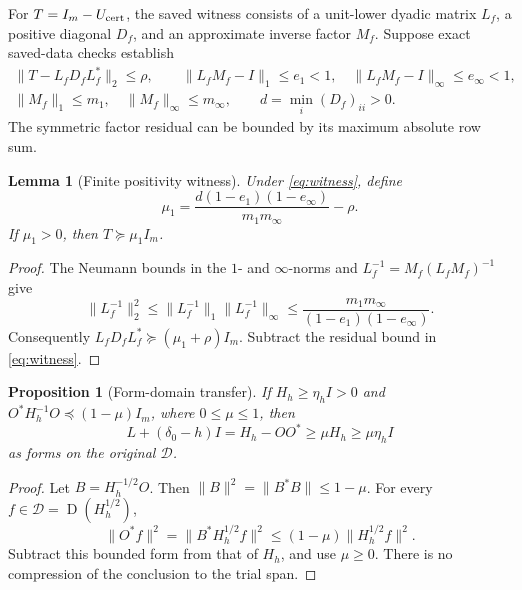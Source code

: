\documentclass[11pt,a4paper]{article}
\newcommand{\DD}{\mathcal D}
\newcommand{\Id}{I}
\newcommand{\Dom}{\operatorname{D}}
\newcommand{\norm}[1]{\lVert #1\rVert}
\newtheorem{proposition}[theorem]{Proposition}
\newtheorem{lemma}[theorem]{Lemma}
\theoremstyle{definition}
\theoremstyle{remark}
\numberwithin{equation}{section}
\begin{document}
For \(T=I_m-U_{\rm cert}\), the saved witness consists of a unit-lower
dyadic matrix \(L_f\), a positive diagonal \(D_f\), and an approximate
inverse factor \(M_f\). Suppose exact saved-data checks establish
\begin{equation}\label{eq:witness}
 \begin{gathered}
 \norm{T-L_fD_fL_f^*}_2\le\rho,\qquad
 \norm{L_fM_f-I}_1\le e_1<1,\quad
 \norm{L_fM_f-I}_\infty\le e_\infty<1,\\
 \norm{M_f}_1\le m_1,\quad \norm{M_f}_\infty\le m_\infty,\qquad
 d=\min_i(D_f)_{ii}>0.
 \end{gathered}
\end{equation}
The symmetric factor residual can be bounded by its maximum absolute
row sum.

\begin{lemma}[Finite positivity witness]\label{lem:factor}
Under \eqref{eq:witness}, define
\begin{equation}\label{eq:mu}
 \mu_1=\frac{d(1-e_1)(1-e_\infty)}{m_1m_\infty}-\rho.
\end{equation}
If \(\mu_1>0\), then \(T\succeq\mu_1 I_m\).
\end{lemma}
\begin{proof}
The Neumann bounds in the \(1\)- and \(\infty\)-norms and
\(L_f^{-1}=M_f(L_fM_f)^{-1}\) give
\[
 \norm{L_f^{-1}}_2^2
 \le\norm{L_f^{-1}}_1\norm{L_f^{-1}}_\infty
 \le\frac{m_1m_\infty}{(1-e_1)(1-e_\infty)}.
\]
Consequently \(L_fD_fL_f^*\succeq(\mu_1+\rho)I_m\).
Subtract the residual bound in \eqref{eq:witness}.
\end{proof}

\begin{proposition}[Form-domain transfer]\label{prop:form-transfer}
If \(H_h\ge\eta_h\Id>0\) and
\(O^*H_h^{-1}O\preceq(1-\mu)I_m\), where \(0\le\mu\le1\), then
\begin{equation}\label{eq:transfer}
 L+(\delta_0-h)\Id=H_h-OO^*
      \ge\mu H_h\ge\mu\eta_h\Id
\end{equation}
as forms on the original \(\DD\).
\end{proposition}
\begin{proof}
Let \(B=H_h^{-1/2}O\). Then
\(\norm{B}^2=\norm{B^*B}\le1-\mu\).
For every \(f\in\DD=\Dom(H_h^{1/2})\),
\[
 \norm{O^*f}^2=\norm{B^*H_h^{1/2}f}^2
       \le(1-\mu)\norm{H_h^{1/2}f}^2.
\]
Subtract this bounded form from that of \(H_h\), and use \(\mu\ge0\).
There is no compression of the conclusion to the trial span.
\end{proof}
\end{document}
